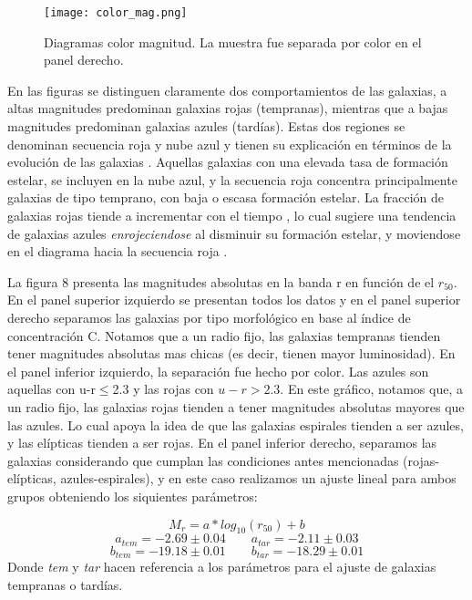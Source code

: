 \documentclass[a4paper,10pt]{article}
\begin{document}
\begin{figure}[h]
 \centering
 \texttt{[image: color\_mag.png]}
 \caption{Diagramas color magnitud. La muestra fue separada por color en el panel derecho.}

 \label{fig: 8}
\end{figure}

En las figuras se distinguen claramente dos comportamientos de las galaxias, a altas magnitudes predominan galaxias rojas (tempranas), mientras que a bajas magnitudes predominan galaxias azules (tard\'ias). Estas dos regiones se denominan secuencia roja y nube azul y tienen su explicaci\'on en t\'erminos de la evoluci\'on de las galaxias \citep{Schneider}. 
Aquellas galaxias con una elevada tasa de formaci\'on estelar, se incluyen en la nube azul, y la secuencia roja concentra principalmente galaxias de tipo temprano, con baja o escasa formaci\'on estelar. 
La fracci\'on de galaxias rojas tiende a incrementar con el tiempo \citep{Faber2007}, lo cual sugiere una tendencia de galaxias azules \textit{enrojeciendose} al disminuir su formaci\'on estelar, y moviendose en el diagrama hacia la secuencia roja \citep{Wyder2007}. 


La figura 8 presenta las magnitudes absolutas en la banda r en funci\'on de el $r_{50}$. En el panel superior izquierdo se presentan todos los datos y en el panel superior derecho separamos las galaxias por tipo morfol\'ogico en base al \'indice de concentraci\'on C. Notamos que a un radio fijo, las galaxias tempranas tienden tener magnitudes absolutas mas chicas (es decir, tienen mayor luminosidad). En el panel inferior izquierdo, la separaci\'on fue hecho por color. Las azules son aquellas con u-r$\leq$2.3 y las rojas con $u-r>2.3$. En este gr\'afico, notamos que, a un radio fijo, las galaxias rojas tienden a tener magnitudes absolutas mayores que las azules. Lo cual apoya la idea de que las galaxias espirales tienden a ser azules, y las el\'ipticas tienden a ser rojas. En el panel inferior derecho, separamos las galaxias considerando que cumplan las condiciones antes mencionadas (rojas-el\'ipticas, azules-espirales), y en este caso realizamos un ajuste lineal para ambos grupos obteniendo los siquientes par\'ametros:

\begin{equation}
 M_{r}=a*log_{10}(r_{50})+b
\end{equation}
$$
a_{tem}=-2.69 \pm 0.04  \qquad a_{tar}=-2.11 \pm 0.03
$$
$$
 b_{tem}=-19.18 \pm 0.01 \qquad b_{tar}=-18.29 \pm 0.01
$$
Donde \textit{tem} y \textit{tar} hacen referencia a los par\'ametros para el ajuste de galaxias tempranas o tard\'ias. 
\end{document}
